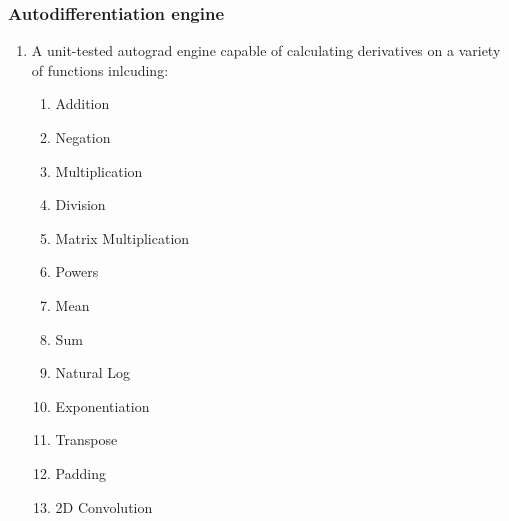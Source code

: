 \documentclass{article}
\begin{document}
    \subsubsection{Autodifferentiation engine} \label{AutodifferentiationObjectives}
    \begin{enumerate}
        \item A unit-tested autograd engine capable of calculating derivatives on a variety of functions inlcuding:
        \begin{enumerate}
            \item Addition
            \item Negation
            \item Multiplication
            \item Division
            \item Matrix Multiplication
            \item Powers
            \item Mean
            \item Sum
            \item Natural Log
            \item Exponentiation
            \item Transpose
            \item Padding
            \item 2D Convolution
        \end{enumerate}
    \end{enumerate}
\end{document}
